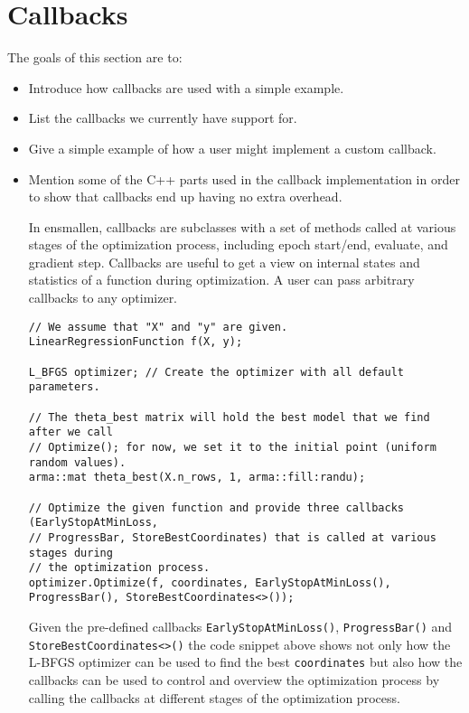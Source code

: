 \section{Callbacks}
\label{sec:callbacks}

The goals of this section are to:

\begin{itemize}
  \item Introduce how callbacks are used with a simple example.

  \item List the callbacks we currently have support for.

  \item Give a simple example of how a user might implement a custom callback.

  \item Mention some of the C++ parts used in the callback implementation in
order to show that callbacks end up having no extra overhead.

In ensmallen, callbacks are subclasses with a set of methods called at various
stages of the optimization process, including epoch start/end, evaluate, and
gradient step. Callbacks are useful to get a view on internal states and
statistics of a function during optimization. A user can pass arbitrary
callbacks to any optimizer.

\begin{verbatim}
// We assume that "X" and "y" are given.
LinearRegressionFunction f(X, y);

L_BFGS optimizer; // Create the optimizer with all default parameters.

// The theta_best matrix will hold the best model that we find after we call
// Optimize(); for now, we set it to the initial point (uniform random values).
arma::mat theta_best(X.n_rows, 1, arma::fill:randu);

// Optimize the given function and provide three callbacks (EarlyStopAtMinLoss,
// ProgressBar, StoreBestCoordinates) that is called at various stages during
// the optimization process.
optimizer.Optimize(f, coordinates, EarlyStopAtMinLoss(), ProgressBar(), StoreBestCoordinates<>());
\end{verbatim}

Given the pre-defined callbacks {\tt EarlyStopAtMinLoss()}, {\tt ProgressBar()}
and {\tt StoreBestCoordinates<>()} the code snippet above shows not only how the
L-BFGS optimizer can be used to find the best {\tt \small coordinates} but also
how the callbacks can be used to control and overview the optimization process
by calling the callbacks at different stages of the optimization process.


\end{itemize}
